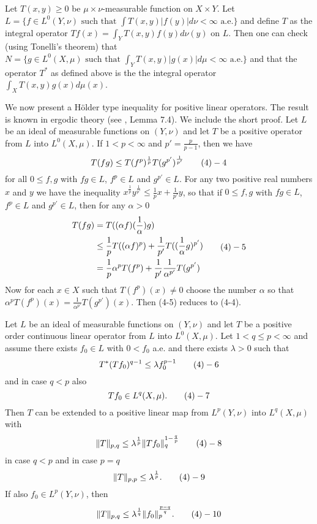  Let $T(x,y)\ge 0$ be $\mu \times \nu$-measurable function on
$X\times Y$. Let $L= \{ f\in L^0(Y,\nu) \text { such that } \int
T(x,y)|f(y)|d\nu <\infty \text { a.e.}\}$ and define $T$ as the integral
operator $Tf(x)= \int_Y T(x,y)f(y) d\nu (y)$
on $L$. Then one can check (using Tonelli's theorem) that $N= \{ g\in
L^0(X,\mu) \text{ such that } \int_Y T(x,y)|g(x)|d\mu <\infty \text { a.e.}\}$
and that the operator $T^*$ as defined above is the the integral operator 
$\int_X T(x,y)g(x)d\mu (x)$.
\enddemo

We now present a H\"older type inequality for positive linear operators. The
result is known in ergodic theory (see \cite{K}, Lemma 7.4). We include the
short proof.
 Let $L$ be an ideal of measurable
functions on $(Y,\nu )$ and let $T$ be a positive operator from $L$ into 
$L^0(X,\mu)$. If  $1<p<\infty$ and $p'=\frac p{p-1}$, then we have
$$T(fg)\le T(f^p)^{\frac 1p} T(g^{p'})^{\frac 1{p'}} \tag 4-4$$
for all $0\le f,g$ with $fg\in L$, $f^p\in L$ and $g^{p'}\in L$.
\endproclaim
{} For any two positive real numbers $x$ and $y$ we have the
inequality $x^{\frac 1p}y^{\frac 1{p'}}\le \frac 1p x+\frac 1{p'} y$, so that
if $0\le f,g$ with $fg\in L$, $f^p\in L$ and $g^{p'}\in L$, then for any
$\alpha >0$
$$\aligned T(fg)&= T((\alpha f)(\frac 1\alpha )g)\\
&\le \frac 1p T((\alpha f)^{p})+\frac 1{p'} T((\frac 1\alpha g)^{p'})\\
&= \frac 1p  \alpha^p T(f^p) +\frac1{p'} \frac 1{\alpha^{p'}}
T(g^{p'})\endaligned \tag 4-5
$$
Now for each $x\in X$ such that $T(f^p)(x)\neq 0$ choose the number $\alpha$
so that $\alpha^p T(f^p)(x)= \frac 1{\alpha^{p'}} T(g^{p'})(x)$. Then (4-5)
reduces to (4-4).
\enddemo

 Let $L$ be an ideal of measurable functions on $(Y,\nu )$
and let $T$ be a positive order continuous linear operator from $L$ into
$L^0(X,\mu )$. Let $1<q\le p<\infty$ and assume there exists $f_0\in L$ with
$0<f_0$ a.e. and there exists $\lambda >0$ such that 
$$T^*(Tf_0)^{q-1} \le \lambda f_0^{p-1} \tag 4-6$$ 
and in case $q<p$ also 
$$Tf_0\in L^q(X,\mu).\tag 4-7$$ 
Then $T$ can be extended to a positive linear map from $L^p(Y,\nu)$ into
$L^q(X,\mu)$ with 
$$\ntpq \le \lambda^{\frac 1p} \| Tf_0\|_q ^{1-\frac qp} \tag 4-8$$ 
in case $q<p$ and in case $p=q$ 
$$\ntp \le \lambda ^{\frac 1p}. \tag 4-9$$ 
If also $f_0\in L^p(Y,\nu)$, then 
$$\ntpq \le \lambda^{\frac 1q} \| f_0 \|_p^{\frac {p-q}q}. \tag 4-10$$ 
\endproclaim 

